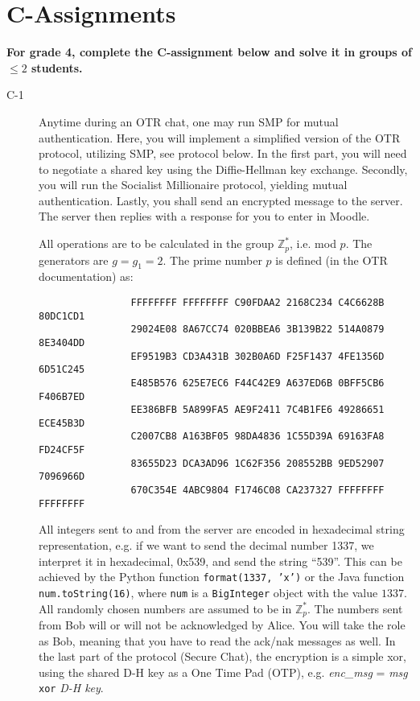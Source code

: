 \documentclass{article}
\begin{document}
		\clearpage
		
		\section*{C-Assignments}
		\textbf{For grade 4, complete the C-assignment below and solve it in groups of $\leq 2$ students.}
		
		\begin{description}
			\item[C-1]{Anytime during an OTR chat, one may run SMP for mutual authentication. Here, you will implement
				a simplified version of the OTR protocol, utilizing SMP, see protocol below. In the first part,
				you will need to negotiate a shared key using the Diffie-Hellman key exchange.
				Secondly, you will run the Socialist Millionaire protocol, yielding mutual authentication.
				Lastly, you shall send an encrypted message to the server. The server then replies with a response for you to enter in Moodle.
				
				All operations are to be calculated in the group $\mathbb{Z}_p^*$, i.e. mod $p$. The generators are $g = g_1 = 2$.
				The prime number $p$ is defined (in the OTR documentation) as:
				\begin{verbatim}
				FFFFFFFF FFFFFFFF C90FDAA2 2168C234 C4C6628B 80DC1CD1
				29024E08 8A67CC74 020BBEA6 3B139B22 514A0879 8E3404DD
				EF9519B3 CD3A431B 302B0A6D F25F1437 4FE1356D 6D51C245
				E485B576 625E7EC6 F44C42E9 A637ED6B 0BFF5CB6 F406B7ED
				EE386BFB 5A899FA5 AE9F2411 7C4B1FE6 49286651 ECE45B3D
				C2007CB8 A163BF05 98DA4836 1C55D39A 69163FA8 FD24CF5F
				83655D23 DCA3AD96 1C62F356 208552BB 9ED52907 7096966D
				670C354E 4ABC9804 F1746C08 CA237327 FFFFFFFF FFFFFFFF
				\end{verbatim}
				
				All integers sent to and from the server are encoded in hexadecimal string representation, e.g. if we
				want to send the decimal number 1337, we interpret it in hexadecimal, 0x539, and send the string ``539''. This can
				be achieved by the Python function \texttt{format(1337, 'x')} or the Java function \texttt{num.toString(16)}, where
				\texttt{num} is a \texttt{BigInteger} object with the value $1337$. All randomly chosen numbers are assumed to be in
				$\mathbb{Z}_p^*$. The numbers sent from Bob will or will not be acknowledged by Alice. You will take the role as Bob, meaning
				that you have to read the ack/nak messages as well. In the last part of the protocol (Secure Chat), the encryption
				is a simple xor, using the shared D-H key as a One Time Pad (OTP), e.g. 
				\emph{enc\_msg} = \emph{msg} \texttt{xor} \emph{D-H key}.
				
}
\end{description}
\end{document}
